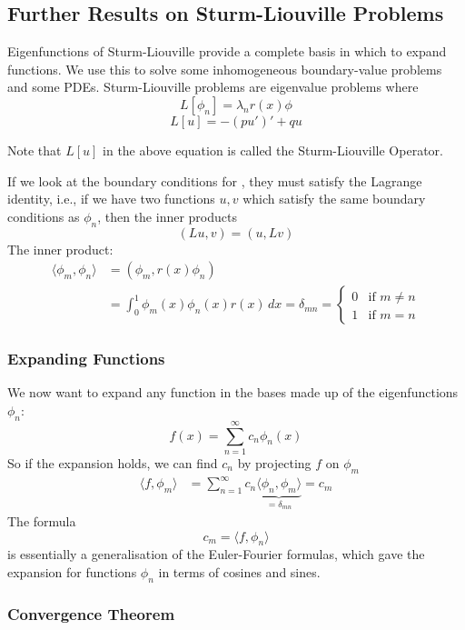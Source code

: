 \subsection{Further Results on Sturm-Liouville Problems}

Eigenfunctions of Sturm-Liouville provide a complete basis in which to expand functions. We use this to solve some inhomogeneous boundary-value problems and some PDEs.
Sturm-Liouville problems are eigenvalue problems where 
\begin{equation}\label{eq6.2.1}
	L[\phi_n] = \lambda_n r(x) \phi
\end{equation}
\[
L[u] = -(pu')' + qu
\]

Note that $L[u]$ in the above equation is called the Sturm-Liouville Operator.

If we look at the boundary conditions for , they must satisfy the Lagrange identity, i.e., if we have two functions $u, v$ which satisfy the same boundary conditions as $\phi_n$, then the inner products
\[
(Lu, v) = (u, Lv)
\]
The inner product:
\begin{align*}
	\langle \phi_m, \phi_n\rangle &= (\phi_m, r(x)\phi_n) \\
	&= \int_0^1 \phi_m(x) \phi_n(x) r(x) \,dx = \delta_{mn} = \begin{cases} 0 & \text{if } m \neq n \\ 1 & \text{if } m = n \end{cases}
\end{align*}

\subsubsection{Expanding Functions}

We now want to expand any function in the bases made up of the eigenfunctions $\phi_n$:
\[
f(x) = \sum_{n=1}^{\infty}c_n \phi_n(x)
\]
So if the expansion holds, we can find $c_n$ by projecting $f$ on $\phi_m$
\begin{align*}
	\langle f, \phi_m\rangle &= \sum_{n=1}^{\infty} c_n \underbrace{\langle \phi_n, \phi_m\rangle}_{=\delta_{mn}} = c_m
\end{align*}
The formula
\[
c_m = \langle f, \phi_n\rangle
\]
is essentially a generalisation of the Euler-Fourier formulas, which gave the expansion for functions $\phi_n$ in terms of cosines and sines.

\subsubsection{Convergence Theorem}

